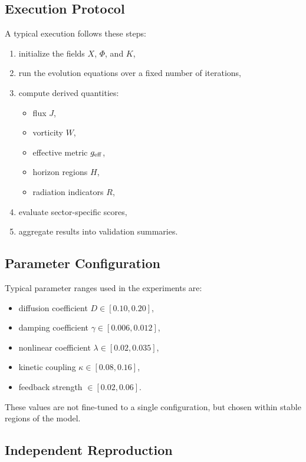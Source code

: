 \documentclass[11pt]{article}
\begin{document}
\subsection{Execution Protocol}

A typical execution follows these steps:

\begin{enumerate}
\item initialize the fields $X$, $\Phi$, and $K$,
\item run the evolution equations over a fixed number of iterations,
\item compute derived quantities:
\begin{itemize}
\item flux $J$,
\item vorticity $W$,
\item effective metric $g_{\rm eff}$,
\item horizon regions $H$,
\item radiation indicators $R$,
\end{itemize}
\item evaluate sector-specific scores,
\item aggregate results into validation summaries.
\end{enumerate}

\subsection{Parameter Configuration}

Typical parameter ranges used in the experiments are:

\begin{itemize}
\item diffusion coefficient $D \in [0.10, 0.20]$,
\item damping coefficient $\gamma \in [0.006, 0.012]$,
\item nonlinear coefficient $\lambda \in [0.02, 0.035]$,
\item kinetic coupling $\kappa \in [0.08, 0.16]$,
\item feedback strength $\in [0.02, 0.06]$.
\end{itemize}

These values are not fine-tuned to a single configuration, but chosen within stable regions of the model.

\subsection{Independent Reproduction}
\end{document}
